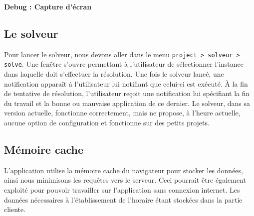 \textbf{Debug : Capture d'écran}


\subsection{Le solveur}
Pour lancer le solveur, nous devons aller dans le menu \texttt{project > solveur > solve}. Une fenêtre s'ouvre permettant à l'utilisateur de sélectionner l'instance dans laquelle doit s'effectuer la résolution. Une fois le solveur lancé, une notification apparaît à l'utilisateur lui notifiant que celui-ci est exécuté. À la fin de tentative de résolution, l'utilisateur reçoit une notification lui spécifiant la fin du travail et la bonne ou mauvaise application de ce dernier. Le solveur, dans sa version actuelle, fonctionne correctement, mais ne propose, à l'heure actuelle, aucune option de configuration et fonctionne sur des petits projets. 


\subsection{Mémoire cache}
L'application utilise la mémoire cache du navigateur pour stocker les données, ainsi nous minimisons les requêtes vers le serveur. Ceci pourrait être également exploité pour pouvoir travailler sur l'application sans connexion internet. Les données nécessaires à l'établissement de l'horaire étant stockées dans la partie cliente.



















